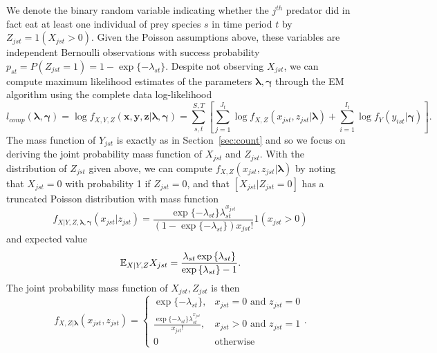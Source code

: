 \documentclass[smallextended]{svjour3}
\begin{document}
We denote the binary random variable indicating whether the $j^{th}$ predator did in fact eat at least one individual of prey species $s$ in time period $t$ by $Z_{jst} = 1(X_{jst} > 0)$.  Given the Poisson assumptions above, these variables are independent Bernoulli observations with success probability $p_{st} = P(Z_{jst}=1)= 1-\exp\{-\lambda_{st}\}$.  Despite not observing $X_{jst}$, we can compute maximum likelihood estimates of the parameters $\boldsymbol{\lambda}, \boldsymbol{\gamma}$ through the EM algorithm using the complete data log-likelihood
\[
l_{comp}(\boldsymbol{\lambda}, \boldsymbol{\gamma}) = \log f_{X,Y,Z}(\boldsymbol x, \boldsymbol y, \boldsymbol z|\boldsymbol{\lambda}, \boldsymbol{\gamma}) = \sum_{s,t}^{S,T} \left[ \sum_{j=1}^{J_t} \log f_{X,Z}(x_{jst},z_{jst}|\boldsymbol{\lambda}) + \sum_{i=1}^{I_t}\log f_Y(y_{ist}|\boldsymbol{\gamma}) \right].
\]
The mass function of $Y_{jst}$ is exactly as in Section~\ref{sec:count} and so we focus on deriving the joint probability mass function of $X_{jst}$ and $Z_{jst}$.  With the distribution of $Z_{jst}$ given above, we can compute $f_{X,Z}(x_{jst},z_{jst}|\boldsymbol{\lambda})$ by noting that $X_{jst}=0$ with probability 1 if $Z_{jst}=0$, and that $[X_{jst}|Z_{jst}=0]$ has a truncated Poisson distribution with mass function
\[
  f_{X|Y,Z,\boldsymbol{\lambda},\boldsymbol{\gamma}}(x_{jst}|z_{jst}) =
  \frac{\exp{\{-\lambda_{st}\}} \lambda_{st}^{x_{jst}}}{(1 - \exp{\{-\lambda_{st}\}}) x_{jst}!}1(x_{jst} > 0)
\]
and expected value
\[
\mathbb{E}_{X|Y,Z}X_{jst} = \frac{\lambda_{st} \exp{\{\lambda_{st} \}}}{\exp{\{ \lambda_{st} \}} - 1}.
\]
The joint probability mass function of $X_{jst}, Z_{jst}$ is then 
\begin{equation*}
    f_{X,Z|\boldsymbol{\lambda}}(x_{jst},z_{jst}) = \left\{
    \begin{array}{lr}
      \exp{\{ -\lambda_{st} \}}, & x_{jst}=0 \mbox{ and } z_{jst} = 0 \\
      \frac{\exp{\{-\lambda_{st} \}} \lambda_{st}^{x_{jst}}}{x_{jst}!}, & x_{jst} > 0 \mbox{ and } z_{jst} = 1 \\
      0 & \mbox{otherwise}
    \end{array}
  \right..
\end{equation*}
\end{document}
